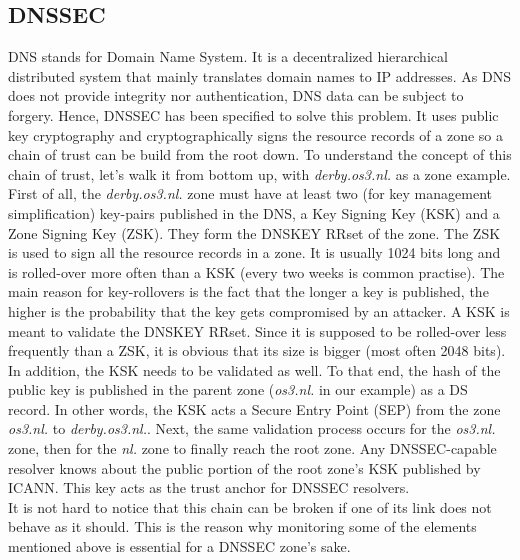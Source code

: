 \subsection{DNSSEC}
DNS stands for Domain Name System. It is a decentralized hierarchical distributed system that mainly translates domain names to IP addresses. As DNS does not provide integrity nor authentication, DNS data can be subject to forgery. Hence, DNSSEC has been specified to solve this problem. It uses public key cryptography and cryptographically signs the resource records of a zone so a chain of trust can be build from the root down.
To understand the concept of this chain of trust, let's walk it from bottom up, with \textit{derby.os3.nl.} as a zone example. 
\\
First of all, the \textit{derby.os3.nl.} zone must have at least two (for key management simplification) key-pairs published in the DNS, a Key Signing Key (KSK) and a Zone Signing Key (ZSK). They form the DNSKEY RRset of the zone. The ZSK is used to sign all the resource records in a zone. It is usually 1024 bits long and is rolled-over more often than a KSK (every two weeks is common practise). The main reason for key-rollovers is the fact that the longer a key is published, the higher is the probability that the key gets compromised by an attacker. A KSK is meant to validate the DNSKEY RRset. Since it is supposed to be rolled-over less frequently than a ZSK, it is obvious that its size is bigger (most often 2048 bits). In addition, the KSK needs to be validated as well. To that end, the hash of the public key is published in the parent zone (\textit{os3.nl.} in our example) as a DS record. In other words, the KSK acts a Secure Entry Point (SEP) from the zone \textit{os3.nl.} to \textit{derby.os3.nl.}. Next, the same validation process occurs for the \textit{os3.nl.} zone, then for the \textit{nl.} zone to  finally reach the root zone. Any DNSSEC-capable resolver knows about the public portion of the root zone's KSK published by ICANN. This key acts as the trust anchor for DNSSEC resolvers.
\\
It is not hard to notice that this chain can be broken if one of its link does not behave as it should. This is the reason why monitoring some of the elements mentioned above is essential for a DNSSEC zone's sake.           

